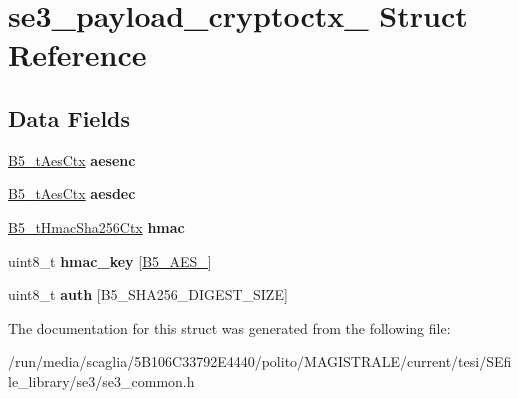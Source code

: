 \hypertarget{structse3__payload__cryptoctx__}{\section{se3\-\_\-payload\-\_\-cryptoctx\-\_\- Struct Reference}
\label{structse3__payload__cryptoctx__}
}
\subsection*{Data Fields}
\begin{DoxyCompactItemize}
\item 
\hypertarget{structse3__payload__cryptoctx___a790d1f56a01416565f79f4f3567a6c8f}{\hyperlink{struct_b5__t_aes_ctx}{B5\-\_\-t\-Aes\-Ctx} {\bfseries aesenc}}\label{structse3__payload__cryptoctx___a790d1f56a01416565f79f4f3567a6c8f}

\item 
\hypertarget{structse3__payload__cryptoctx___a10e1130cdbe14739512d504f9a809d69}{\hyperlink{struct_b5__t_aes_ctx}{B5\-\_\-t\-Aes\-Ctx} {\bfseries aesdec}}\label{structse3__payload__cryptoctx___a10e1130cdbe14739512d504f9a809d69}

\item 
\hypertarget{structse3__payload__cryptoctx___ae595c73521c05a71d9e69d0d7b84e24e}{\hyperlink{struct_b5__t_hmac_sha256_ctx}{B5\-\_\-t\-Hmac\-Sha256\-Ctx} {\bfseries hmac}}\label{structse3__payload__cryptoctx___ae595c73521c05a71d9e69d0d7b84e24e}

\item 
\hypertarget{structse3__payload__cryptoctx___a41a3857d896ccf28514daf24af8e6cf6}{uint8\-\_\-t {\bfseries hmac\-\_\-key} \mbox{[}\hyperlink{group__aes_keys_gaaa12529ea4bb869bdc8f535b81045936}{B5\-\_\-\-A\-E\-S\-\_}\mbox{]}}\label{structse3__payload__cryptoctx___a41a3857d896ccf28514daf24af8e6cf6}

\item 
\hypertarget{structse3__payload__cryptoctx___a934757b3332d30c709705a1c81078df5}{uint8\-\_\-t {\bfseries auth} \mbox{[}B5\-\_\-\-S\-H\-A256\-\_\-\-D\-I\-G\-E\-S\-T\-\_\-\-S\-I\-Z\-E\mbox{]}}\label{structse3__payload__cryptoctx___a934757b3332d30c709705a1c81078df5}

\end{DoxyCompactItemize}


The documentation for this struct was generated from the following file\-:\begin{DoxyCompactItemize}
\item 
/run/media/scaglia/5\-B106\-C33792\-E4440/polito/\-M\-A\-G\-I\-S\-T\-R\-A\-L\-E/current/tesi/\-S\-Efile\-\_\-library/se3/se3\-\_\-common.\-h\end{DoxyCompactItemize}

